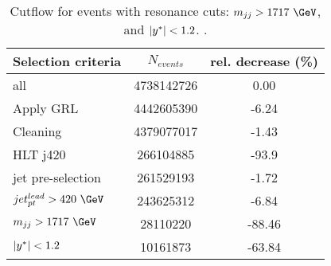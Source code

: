 \begin{table}[htbp]
	\centering
	\begin{tabular}{l|c|c}
		\hline\hline
		Selection criteria & $N_{events}$ & rel. decrease (\%) \\
		\hline
		all      &	4738142726	&	0.00	\\
		Apply GRL 	& 	4442605390        & 	-6.24	 \\
		Cleaning	 & 	4379077017	 & 	-1.43	 \\
		HLT j420	 & 	266104885	 & 	-93.9	 \\
		jet pre-selection	 &     261529193        &      -1.72    \\
		$jet_{pt}^{lead}>420~\GeV$ &   243625312	 & -6.84 \\
		$\mjj>1717~\GeV$	 & 	28110220	 & 	-88.46	 \\
		$|y^\ast| < 1.2$	 & 	10161873	 & 	-63.84	 \\
		\hline\hline
	\end{tabular}
	\caption{Cutflow for
		events with \Wstar resonance cuts:  $\mjj>1717~\GeV$, and $|y^\ast|<1.2$. .
		\label{tab:cutFlow_wstar_run2} }
\end{table}






